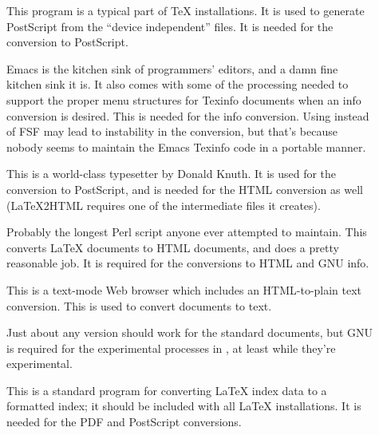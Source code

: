 \documentclass{howto}
\begin{document}
    \begin{description}
      \item[]
        This program is a typical part of \TeX{} installations.  It is
        used to generate PostScript from the ``device independent''
         files.  It is needed for the conversion to
        PostScript.

      \item[]
        Emacs is the kitchen sink of programmers' editors, and a damn
        fine kitchen sink it is.  It also comes with some of the
        processing needed to support the proper menu structures for
        Texinfo documents when an info conversion is desired.  This is
        needed for the info conversion.  Using 
        instead of FSF  may lead to instability in the
        conversion, but that's because nobody seems to maintain the
        Emacs Texinfo code in a portable manner.

      \item[]
        This is a world-class typesetter by Donald Knuth.  It is used
        for the conversion to PostScript, and is needed for the HTML
        conversion as well (\LaTeX2HTML requires one of the
        intermediate files it creates).

      \item[]
        Probably the longest Perl script anyone ever attempted to
        maintain.  This converts \LaTeX{} documents to HTML documents,
        and does a pretty reasonable job.  It is required for the
        conversions to HTML and GNU info.

      \item[]
        This is a text-mode Web browser which includes an
        HTML-to-plain text conversion.  This is used to convert
         documents to text.

      \item[]
        Just about any version should work for the standard documents,
        but GNU  is required for the experimental
        processes in , at least while
        they're experimental.

      \item[]
        This is a standard program for converting \LaTeX{} index data
        to a formatted index; it should be included with all \LaTeX{}
        installations.  It is needed for the PDF and PostScript
        conversions.


\end{description}
\end{document}
